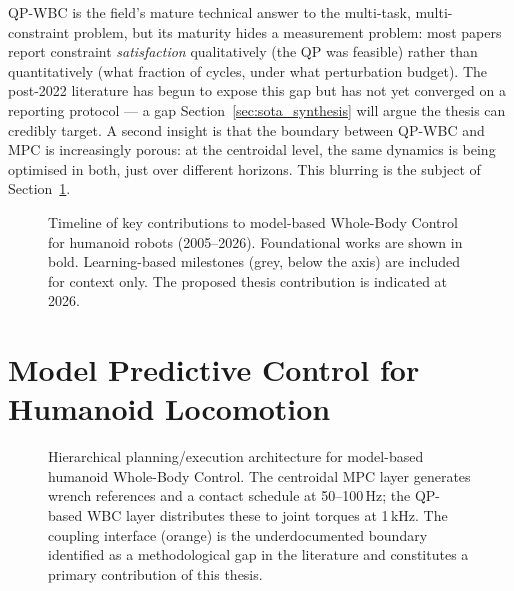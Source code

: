 \begin{criticalinsight}
QP-WBC is the field's mature technical answer to the multi-task,
multi-constraint problem, but its maturity hides a measurement problem:
most papers report constraint \emph{satisfaction} qualitatively (the QP
was feasible) rather than quantitatively (what fraction of cycles, under
what perturbation budget). The post-2022 literature has begun to expose
this gap \cite{LeCleach2024,Smaldone2025} but has not yet converged on a
reporting protocol --- a gap Section~\ref{sec:sota_synthesis} will argue
the thesis can credibly target. A second insight is that the boundary
between QP-WBC and MPC is increasingly porous: at the centroidal level,
the same dynamics is being optimised in both, just over different
horizons. This blurring is the subject of Section~\ref{sec:sota_mpc}.
\end{criticalinsight}



\begin{figure}[htbp]
  \centering
  \resizebox{\textwidth}{!}{}
  \caption{Timeline of key contributions to model-based Whole-Body Control
           for humanoid robots (2005--2026). Foundational works are shown in
           bold. Learning-based milestones (grey, below the axis) are included
           for context only. The proposed thesis contribution is indicated at 2026.}
  \label{fig:wbc_timeline}
\end{figure}

\section{Model Predictive Control for Humanoid Locomotion}
\label{sec:sota_mpc}

\begin{figure}[htbp]
  \centering
  
  \caption{Hierarchical planning/execution architecture for model-based humanoid
           Whole-Body Control. The centroidal MPC layer generates wrench references
           and a contact schedule at 50--100\,Hz; the QP-based WBC layer distributes
           these to joint torques at 1\,kHz. The coupling interface (orange) is the
           underdocumented boundary identified as a methodological gap in the
           literature and constitutes a primary contribution of this thesis.}
  \label{fig:wbc_architecture}
\end{figure}

